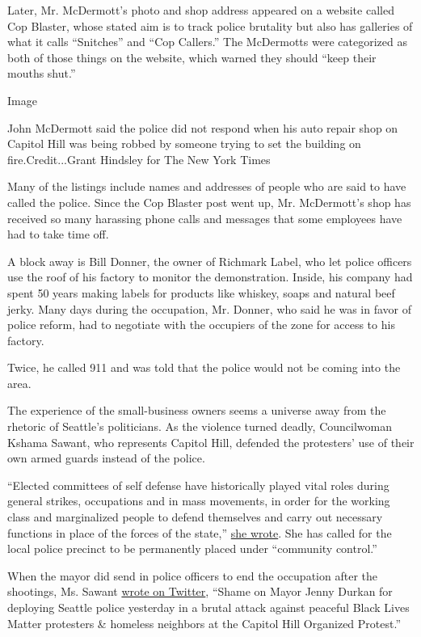 Later, Mr. McDermott's photo and shop address appeared on a website
called Cop Blaster, whose stated aim is to track police brutality but
also has galleries of what it calls ``Snitches'' and ``Cop Callers.''
The McDermotts were categorized as both of those things on the website,
which warned they should ``keep their mouths shut.''

Image

John McDermott said the police did not respond when his auto repair shop
on Capitol Hill was being robbed by someone trying to set the building
on fire.Credit...Grant Hindsley for The New York Times

Many of the listings include names and addresses of people who are said
to have called the police. Since the Cop Blaster post went up, Mr.
McDermott's shop has received so many harassing phone calls and messages
that some employees have had to take time off.

A block away is Bill Donner, the owner of Richmark Label, who let police
officers use the roof of his factory to monitor the demonstration.
Inside, his company had spent 50 years making labels for products like
whiskey, soaps and natural beef jerky. Many days during the occupation,
Mr. Donner, who said he was in favor of police reform, had to negotiate
with the occupiers of the zone for access to his factory.

Twice, he called 911 and was told that the police would not be coming
into the area.

The experience of the small-business owners seems a universe away from
the rhetoric of Seattle's politicians. As the violence turned deadly,
Councilwoman Kshama Sawant, who represents Capitol Hill, defended the
protesters' use of their own armed guards instead of the police.

``Elected committees of self defense have historically played vital
roles during general strikes, occupations and in mass movements, in
order for the working class and marginalized people to defend themselves
and carry out necessary functions in place of the forces of the state,''
\href{https://council.seattle.gov/2020/06/20/statement-on-the-shooting-at-the-capitol-hill-organized-protest/}{she
wrote}. She has called for the local police precinct to be permanently
placed under ``community control.''

When the mayor did send in police officers to end the occupation after
the shootings, Ms. Sawant
\href{https://twitter.com/cmkshama/status/1278848527460757505?lang=en}{wrote
on Twitter}, ``Shame on Mayor Jenny Durkan for deploying Seattle police
yesterday in a brutal attack against peaceful Black Lives Matter
protesters \& homeless neighbors at the Capitol Hill Organized
Protest.''

